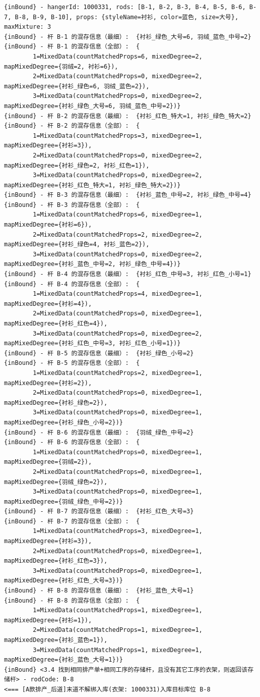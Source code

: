 {\begin{verbatim}
{inBound} - hangerId: 1000331, rods: [B-1, B-2, B-3, B-4, B-5, B-6, B-7, B-8, B-9, B-10], props: {styleName=衬衫, color=蓝色, size=大号}, maxMixture: 3
{inBound} - 杆 B-1 的混存信息（最细）:  {衬衫_绿色_大号=6, 羽绒_蓝色_中号=2}
{inBound} - 杆 B-1 的混存信息（全部）:  {
		1=MixedData(countMatchedProps=6, mixedDegree=2, mapMixedDegree={羽绒=2, 衬衫=6}), 
		2=MixedData(countMatchedProps=0, mixedDegree=2, mapMixedDegree={衬衫_绿色=6, 羽绒_蓝色=2}), 
		3=MixedData(countMatchedProps=0, mixedDegree=2, mapMixedDegree={衬衫_绿色_大号=6, 羽绒_蓝色_中号=2})}
{inBound} - 杆 B-2 的混存信息（最细）:  {衬衫_红色_特大=1, 衬衫_绿色_特大=2}
{inBound} - 杆 B-2 的混存信息（全部）:  {
		1=MixedData(countMatchedProps=3, mixedDegree=1, mapMixedDegree={衬衫=3}), 
		2=MixedData(countMatchedProps=0, mixedDegree=2, mapMixedDegree={衬衫_绿色=2, 衬衫_红色=1}), 
		3=MixedData(countMatchedProps=0, mixedDegree=2, mapMixedDegree={衬衫_红色_特大=1, 衬衫_绿色_特大=2})}
{inBound} - 杆 B-3 的混存信息（最细）:  {衬衫_蓝色_中号=2, 衬衫_绿色_中号=4}
{inBound} - 杆 B-3 的混存信息（全部）:  {
		1=MixedData(countMatchedProps=6, mixedDegree=1, mapMixedDegree={衬衫=6}), 
		2=MixedData(countMatchedProps=2, mixedDegree=2, mapMixedDegree={衬衫_绿色=4, 衬衫_蓝色=2}), 
		3=MixedData(countMatchedProps=0, mixedDegree=2, mapMixedDegree={衬衫_蓝色_中号=2, 衬衫_绿色_中号=4})}
{inBound} - 杆 B-4 的混存信息（最细）:  {衬衫_红色_中号=3, 衬衫_红色_小号=1}
{inBound} - 杆 B-4 的混存信息（全部）:  {
		1=MixedData(countMatchedProps=4, mixedDegree=1, mapMixedDegree={衬衫=4}), 
		2=MixedData(countMatchedProps=0, mixedDegree=1, mapMixedDegree={衬衫_红色=4}), 
		3=MixedData(countMatchedProps=0, mixedDegree=2, mapMixedDegree={衬衫_红色_中号=3, 衬衫_红色_小号=1})}
{inBound} - 杆 B-5 的混存信息（最细）:  {衬衫_绿色_小号=2}
{inBound} - 杆 B-5 的混存信息（全部）:  {
		1=MixedData(countMatchedProps=2, mixedDegree=1, mapMixedDegree={衬衫=2}), 
		2=MixedData(countMatchedProps=0, mixedDegree=1, mapMixedDegree={衬衫_绿色=2}), 
		3=MixedData(countMatchedProps=0, mixedDegree=1, mapMixedDegree={衬衫_绿色_小号=2})}
{inBound} - 杆 B-6 的混存信息（最细）:  {羽绒_绿色_中号=2}
{inBound} - 杆 B-6 的混存信息（全部）:  {
		1=MixedData(countMatchedProps=0, mixedDegree=1, mapMixedDegree={羽绒=2}), 
		2=MixedData(countMatchedProps=0, mixedDegree=1, mapMixedDegree={羽绒_绿色=2}), 
		3=MixedData(countMatchedProps=0, mixedDegree=1, mapMixedDegree={羽绒_绿色_中号=2})}
{inBound} - 杆 B-7 的混存信息（最细）:  {衬衫_红色_大号=3}
{inBound} - 杆 B-7 的混存信息（全部）:  {
		1=MixedData(countMatchedProps=3, mixedDegree=1, mapMixedDegree={衬衫=3}), 
		2=MixedData(countMatchedProps=0, mixedDegree=1, mapMixedDegree={衬衫_红色=3}), 
		3=MixedData(countMatchedProps=0, mixedDegree=1, mapMixedDegree={衬衫_红色_大号=3})}
{inBound} - 杆 B-8 的混存信息（最细）:  {衬衫_蓝色_大号=1}
{inBound} - 杆 B-8 的混存信息（全部）:  {
		1=MixedData(countMatchedProps=1, mixedDegree=1, mapMixedDegree={衬衫=1}), 
		2=MixedData(countMatchedProps=1, mixedDegree=1, mapMixedDegree={衬衫_蓝色=1}), 
		3=MixedData(countMatchedProps=1, mixedDegree=1, mapMixedDegree={衬衫_蓝色_大号=1})}
{inBound} <3.4 找到相同排产单+相同工序的存储杆，且没有其它工序的衣架，则返回该存储杆> - rodCode: B-8
<=== [A款排产_后道]末道不解绑入库(衣架: 1000331)入库目标库位 B-8


\end{verbatim}}
